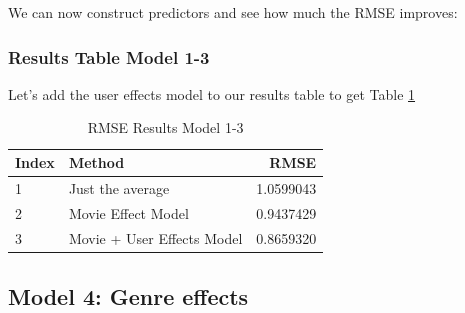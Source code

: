 \documentclass[
]{article}
\newenvironment{Shaded}{}{}
\newcommand{\AttributeTok}[1]{\textcolor[rgb]{0.49,0.56,0.16}{#1}}
\newcommand{\DecValTok}[1]{\textcolor[rgb]{0.25,0.63,0.44}{#1}}
\newcommand{\FloatTok}[1]{\textcolor[rgb]{0.25,0.63,0.44}{#1}}
\newcommand{\FunctionTok}[1]{\textcolor[rgb]{0.02,0.16,0.49}{#1}}
\newcommand{\NormalTok}[1]{#1}
\newcommand{\OtherTok}[1]{\textcolor[rgb]{0.00,0.44,0.13}{#1}}
\newcommand{\SpecialCharTok}[1]{\textcolor[rgb]{0.25,0.44,0.63}{#1}}
\newcommand{\StringTok}[1]{\textcolor[rgb]{0.25,0.44,0.63}{#1}}
\begin{document}
We can now construct predictors and see how much the RMSE improves:

\begin{Shaded}
\end{Shaded}

\newpage

\hypertarget{results-table-model-1-3}{%
\subsubsection{Results Table Model 1-3}\label{results-table-model-1-3}}

Let's add the user effects model to our results table to get Table
\ref{tbl:rmse_results_model_1-3}

\begin{table}[H]

\caption{\label{tab:ue_6}RMSE Results Model 1-3\label{tbl:rmse_results_model_1-3}}
\centering
\fontsize{7}{9}\selectfont
\begin{tabular}[t]{llr}
\toprule
Index & Method & RMSE\\
\midrule
1 & Just the average & 1.0599043\\
2 & Movie Effect Model & 0.9437429\\
3 & Movie + User Effects Model & 0.8659320\\
\bottomrule
\end{tabular}
\end{table}

\newpage

\hypertarget{model-4-genre-effects}{%
\subsection{Model 4: Genre effects}\label{model-4-genre-effects}}
\end{document}
